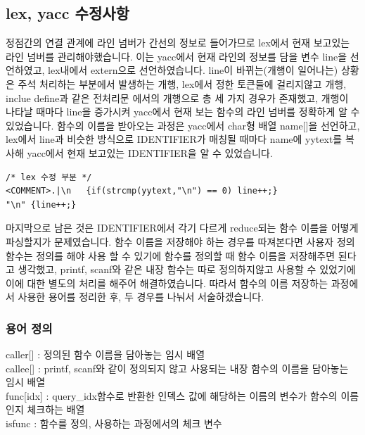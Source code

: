 \documentclass{article}
\begin{document}
    \subsection{lex, yacc 수정사항}
        정점간의 연결 관계에 라인 넘버가 간선의 정보로 들어가므로 lex에서 현재 보고있는 라인 넘버를 관리해야했습니다. 이는
        yacc에서 현재 라인의 정보를 담을 변수 line을 선언하였고, lex내에서 extern으로 선언하였습니다. line이 바뀌는(개행이 일어나는) 상황은 
        주석 처리하는 부분에서 발생하는 개행, lex에서 정한 토큰들에 걸리지않고 개행, inclue define과 같은 전처리문
        에서의 개행으로 총 세 가지 경우가 존재했고, 개행이 나타날 때마다 line을 증가시켜 yacc에서 현재 보는 함수의 라인 넘버를 정확하게
        알 수 있었습니다. 함수의 이름을 받아오는 과정은 yacc에서 char형 배열 name[]을 선언하고, lex에서 line과 비슷한 방식으로 
        IDENTIFIER가 매칭될 때마다 name에 yytext를 복사해 yacc에서 현재 보고있는 IDENTIFIER을 알 수 있었습니다.  
        \begin{verbatim}
/* lex 수정 부분 */
<COMMENT>.|\n	{if(strcmp(yytext,"\n") == 0) line++;}
"\n" {line++;}
        \end{verbatim}
        마지막으로 남은 것은 IDENTIFIER에서 각기 다르게 reduce되는 함수 이름을 어떻게 파싱할지가 문제였습니다. 함수 이름을 저장해야 하는 경우를 따져본다면 
        사용자 정의 함수는 정의를 해야 사용 할 수 있기에 함수를 정의할 때 함수 이름을 저장해주면 된다고 생각했고, printf, scanf와 같은 내장 함수는 따로 정의하지않고 
        사용할 수 있었기에 이에 대한 별도의 처리를 해주어 해결하였습니다. 따라서 함수의 이름 저장하는 과정에서 사용한 용어를 정리한 후, 두 경우를 나눠서 서술하겠습니다. \\
            \subsubsection{용어 정의}
            	caller[] : 정의된 함수 이름을 담아놓는 임시 배열\\
                callee[] : printf, scanf와 같이 정의되지 않고 사용되는 내장 함수의 이름을 담아놓는 임시 배열\\
                func[idx] : query\_idx함수로 반환한 인덱스 값에 해당하는 이름의 변수가 함수의 이름인지 체크하는 배열\\
                isfunc : 함수를 정의, 사용하는 과정에서의 체크 변수\\
\end{document}

